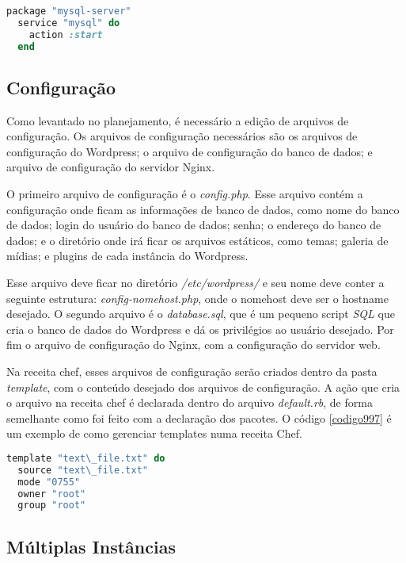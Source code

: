 \begin{lstlisting}[language=Ruby,label=dice_index,caption={Exemplo de criação de serviço do mysql com o chef}, label=codigo998]
  package "mysql-server"
  service "mysql" do
    action :start
  end
\end{lstlisting}


\subsection{Configuração}
\label{wordpress:preparacao}

Como levantado no planejamento, é necessário a edição de arquivos de configuração. Os
arquivos de configuração necessários são os arquivos de configuração do Wordpress; 
o arquivo de configuração do banco de dados; e arquivo de configuração do servidor Nginx.

O primeiro arquivo de configuração é o \textit{config.php}. Esse arquivo contém a
configuração onde ficam as informações de banco de dados, como nome do banco de dados;
login do usuário do banco de dados; senha; o endereço do banco de dados; e o diretório
onde irá ficar os arquivos estáticos, como temas; galeria de mídias; e plugins 
de cada instância do Wordpress.

Esse arquivo deve ficar no diretório \textit{/etc/wordpress/} e seu nome deve conter
a seguinte estrutura: \textit{config-nomehost.php}, onde o nomehost deve ser o hostname
desejado. O segundo arquivo é o \textit{database.sql}, que é um pequeno script \textit{SQL} que
cria o banco de dados do Wordpress e dá os privilégios ao usuário desejado. Por fim
o arquivo de configuração do Nginx, com a configuração do servidor web.

Na receita chef, esses arquivos de configuração serão criados dentro da pasta 
\textit{template}, com o conteúdo
desejado dos arquivos de configuração. A ação que cria o arquivo na receita chef é 
declarada dentro do arquivo \textit{default.rb}, de forma semelhante como foi feito com
a declaração dos pacotes. O código \ref{codigo997} é um exemplo de como 
gerenciar templates numa receita Chef.

\begin{lstlisting}[language=Ruby,label=dice_index,caption={Exemplo de criação de templates com o chef}, label=codigo997]
  template "text\_file.txt" do
  source "text\_file.txt"
  mode "0755"
  owner "root"
  group "root"
\end{lstlisting}

\subsection{Múltiplas Instâncias}

